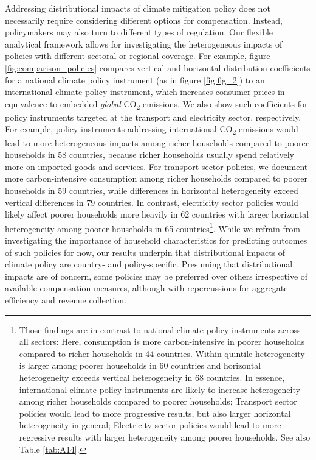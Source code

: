 \documentclass[12pt, a4paper]{article}
\begin{document}
Addressing distributional impacts of climate mitigation policy does not necessarily require considering different options for compensation. Instead, policymakers may also turn to different types of regulation. Our flexible analytical framework allows for investigating the heterogeneous impacts of policies with different sectoral or regional coverage. For example, figure \ref{fig:comparison_policies} compares vertical and horizontal distribution coefficients for a national climate policy instrument (as in figure \ref{fig:fig_2}) to an international climate policy instrument, which increases consumer prices in equivalence to embedded \textit{global} CO\textsubscript{2}-emissions. We also show such coefficients for policy instruments targeted at the transport and electricity sector, respectively. For example, policy instruments addressing international CO\textsubscript{2}-emissions  \autocite[such as border carbon adjustment, e.g][]{Mehling.2019,Cosbey.2019} would lead to more heterogeneous impacts among richer households compared to poorer households in 58 countries, because richer households usually spend relatively more on imported goods and services. For transport sector policies, we document more carbon-intensive consumption among richer households compared to poorer households in 59 countries, while differences in horizontal heterogeneity exceed vertical differences in 79 countries. In contrast, electricity sector policies would likely affect poorer households more heavily in 62 countries with larger horizontal heterogeneity among poorer households in 65 countries\footnote{Those findings are in contrast to national climate policy instruments across all sectors: Here, consumption is more carbon-intensive in poorer households compared to richer households in 44 countries. Within-quintile heterogeneity is larger among poorer households in 60 countries and horizontal heterogeneity exceeds vertical heterogeneity in 68 countries. In essence, international climate policy instruments are likely to increase heterogeneity among richer households compared to poorer households; Transport sector policies would lead to more progressive results, but also larger horizontal heterogeneity in general; Electricity sector policies would lead to more regressive results with larger heterogeneity among poorer households. See also Table \ref{tab:A14}.}. While we refrain from investigating the importance of household characteristics for predicting outcomes of such policies for now, our results underpin that distributional impacts of climate policy are country- and policy-specific. Presuming that distributional impacts are of concern, some policies may be preferred over others irrespective of available compensation measures, although with repercussions for aggregate efficiency and revenue collection. 
\end{document}
